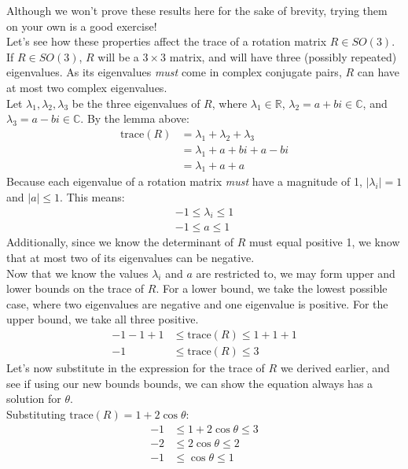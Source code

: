 \documentclass[oneside]{book}
\begin{document}
Although we won't prove these results here for the sake of brevity, trying them on your own is a good exercise!\\
Let's see how these properties affect the trace of a rotation matrix $R\in SO(3)$. If $R \in SO(3)$, $R$ will be a $3\times 3$ matrix, and will have three (possibly repeated) eigenvalues. As its eigenvalues \textit{must} come in complex conjugate pairs, $R$ can have at most two complex eigenvalues.\\
Let $\lambda_1, \lambda_2, \lambda_3$ be the three eigenvalues of $R$, where $\lambda_1 \in \mathbb{R}$, $\lambda_2 = a + bi \in \mathbb{C}$, and $\lambda_3 = a - bi \in \mathbb{C}$. By the lemma above:
\begin{align}
    \mathrm{trace}(R) &= \lambda_1 + \lambda_2 + \lambda_3\\
    &= \lambda_1 + a + bi + a - bi\\
    &= \lambda_1 + a + a
\end{align}
Because each eigenvalue of a rotation matrix \textit{must} have a magnitude of 1, $|\lambda_i| = 1$ and $|a| \leq 1$. This means:
\begin{align}
    -1 \leq \lambda_i \leq 1\\
    -1 \leq a \leq 1
\end{align}
Additionally, since we know the determinant of $R$ must equal positive 1, we know that at most two of its eigenvalues can be negative.\\
Now that we know the values $\lambda_i$ and $a$ are restricted to, we may form upper and lower bounds on the trace of $R$. For a lower bound, we take the lowest possible case, where two eigenvalues are negative and one eigenvalue is positive. For the upper bound, we take all three positive.
\begin{align}
    -1  -1 + 1 &\leq \mathrm{trace}(R) \leq 1+1+1\\
    -1 &\leq \mathrm{trace}(R) \leq 3
\end{align}
Let's now substitute in the expression for the trace of $R$ we derived earlier, and see if using our new bounds bounds, we can show the equation always has a solution for $\theta$.\\
Substituting $\mathrm{trace}(R) = 1 + 2\cos\theta$:
\begin{align}
    -1 &\leq 1 + 2\cos\theta \leq 3\\
    -2 &\leq 2\cos\theta \leq 2\\
    -1 &\leq \cos\theta \leq 1
\end{align}
\end{document}
